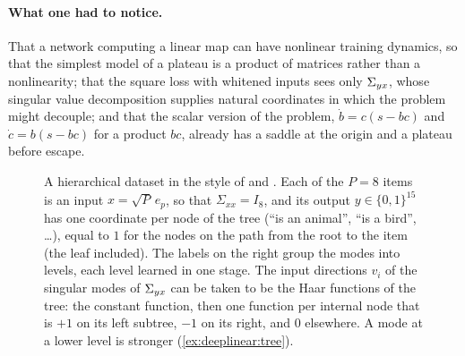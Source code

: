 \begin{refsection}
\paragraph{What one had to notice.} That a network computing a linear map can have nonlinear training dynamics, so that the simplest model of a plateau is a product of matrices rather than a nonlinearity; that the square loss with whitened inputs sees only $\Sigma_{yx}$, whose singular value decomposition supplies natural coordinates in which the problem might decouple; and that the scalar version of the problem, $\dot b=c(s-bc)$ and $\dot c=b(s-bc)$ for a product $bc$, already has a saddle at the origin and a plateau before escape.

\begin{figure}[t]
\centering
{}
\caption{A hierarchical dataset in the style of \textcite{RogersMcClelland2004} and \textcite{SaxeEtAl2019}. Each of the $P=8$ items is an input $x=\sqrt P\,e_p$, so that $\Sigma_{xx}=I_8$, and its output $y\in\{0,1\}^{15}$ has one coordinate per node of the tree (``is an animal'', ``is a bird'', \dots), equal to $1$ for the nodes on the path from the root to the item (the leaf included). The labels on the right group the modes into levels, each level learned in one stage. The input directions $v_i$ of the singular modes of $\Sigma_{yx}$ can be taken to be the Haar functions of the tree: the constant function, then one function per internal node that is $+1$ on its left subtree, $-1$ on its right, and $0$ elsewhere. A mode at a lower level is stronger (\cref{ex:deeplinear:tree}).}\label{fig:deeplinear:tree}
\end{figure}


\end{refsection}
